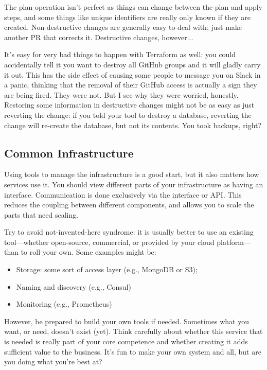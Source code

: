 The plan operation isn't perfect as things can change between the plan and apply steps, and some things like unique identifiers are really only known if they are created. Non-destructive changes are generally easy to deal with; just make another PR that corrects it. Destructive changes, however...

It's easy for very bad things to happen with Terraform as well: you could accidentally tell it you want to destroy all GitHub groups and it will gladly carry it out. This has the side effect of causing some people to message you on Slack in a panic, thinking that the removal of their GitHub access is actually a sign they are being fired. They were not. But I see why they were worried, honestly. Restoring some information in destructive changes might not be as easy as just reverting the change: if you told your tool to destroy a database, reverting the change will re-create the database, but not its contents. You took backups, right?

\subsection*{Common Infrastructure}
Using tools to manage the infrastructure is a good start, but it also matters how services use it. You should view different parts of your infrastructure as having an interface. Communication is done exclusively via the interface or API. This reduces the coupling between different components, and allows you to scale the parts that need scaling. 

Try to avoid not-invented-here syndrome: it is usually better to use an existing tool---whether open-source, commercial, or provided by your cloud platform---than to roll your own. Some examples might be:
\begin{itemize}[noitemsep]
\item Storage: some sort of access layer (e.g., MongoDB or S3);
\item Naming and discovery (e.g., Consul)
\item Monitoring (e.g., Prometheus)
\end{itemize}

However, be prepared to build your own tools if needed. Sometimes what you want, or need, doesn't exist (yet). Think carefully about whether this service that is needed is really part of your core competence and whether creating it adds sufficient value to the business. It's fun to make your own system and all, but are you doing what you're best at? 

